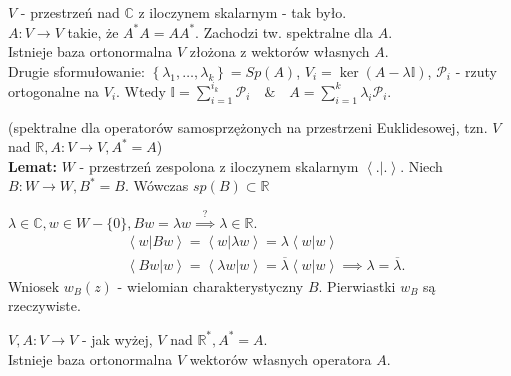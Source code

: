 \documentclass[../main.tex]{subfiles}
\begin{document}
    $V$ - przestrzeń nad $\mathbb{C}$ z iloczynem skalarnym - tak było.\\
    $A: V\to V$ takie, że $A^*A = AA^*$. Zachodzi tw. spektralne dla $A$.\\
    Istnieje baza ortonormalna $V$ złożona z wektorów własnych $A$.\\

    Drugie sformułowanie:
    $ \left\{ \lambda_1,\ldots,\lambda_k \right\} = Sp(A) $, $V_i = \ker(A-\lambda \mathbb{I})$, $\mathcal{P}_i$ - rzuty ortogonalne na $V_i$.
    Wtedy $\mathbb{I} = \sum_{i=1}^{i_k}\mathcal{P}_i \quad\&\quad A = \sum_{i=1}^{k}\lambda_i \mathcal{P}_i$.\\

    \begin{tw}
        (spektralne dla operatorów samosprzężonych na przestrzeni Euklidesowej, tzn. $V$ nad $\mathbb{R}, A:V\to V, A^* = A$)\\
        \textbf{Lemat:} $W$ - przestrzeń zespolona z iloczynem skalarnym $\left<.|. \right>$. Niech $B: W\to W, B^* = B$. Wówczas $sp (B) \subset \mathbb{R}$
        \begin{dowod}
            $\lambda\in\mathbb{C},w\in W-\{0\}, Bw=\lambda w \overset{?}{\implies} \lambda\in\mathbb{R}$.\\
            \begin{align*}
                &\left<w|Bw \right> = \left<w|\lambda w \right> = \lambda \left<w|w \right>\\
                &\left<Bw|w \right> = \left<\lambda w|w \right> = \overline{\lambda}\left<w|w \right> \implies\lambda = \overline{\lambda}
            .\end{align*}
            Wniosek $w_B(z)$ - wielomian charakterystyczny $B$. Pierwiastki $w_B$ są rzeczywiste.
        \end{dowod}
        $V, A:V\to V$ - jak wyżej, $V$ nad $\mathbb{R}^*, A^*=A$.\\
        Istnieje baza ortonormalna $V$ wektorów własnych operatora $A$.
    \end{tw}
\end{document}
